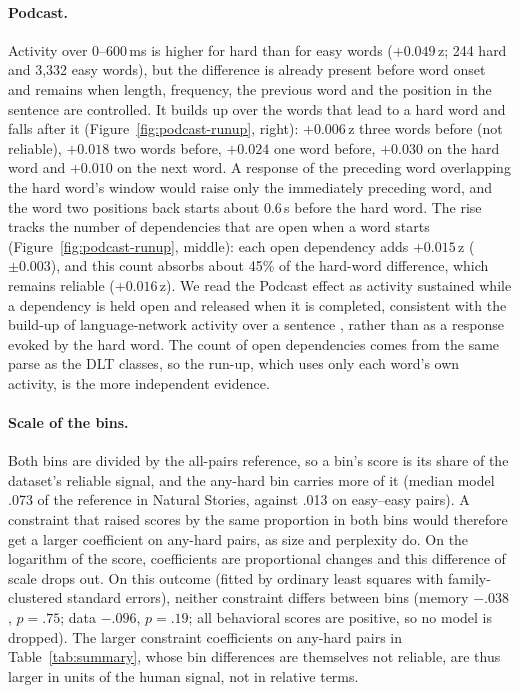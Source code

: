 \paragraph{Podcast.} Activity over 0--600\,ms is higher for hard than for easy words ($+0.049$\,z; 244 hard and 3,332 easy words), but the difference is already present before word onset and remains when length, frequency, the previous word and the position in the sentence are controlled. It builds up over the words that lead to a hard word and falls after it (Figure~\ref{fig:podcast-runup}, right): $+0.006$\,z three words before (not reliable), $+0.018$ two words before, $+0.024$ one word before, $+0.030$ on the hard word and $+0.010$ on the next word. A response of the preceding word overlapping the hard word's window would raise only the immediately preceding word, and the word two positions back starts about 0.6\,s before the hard word. The rise tracks the number of dependencies that are open when a word starts (Figure~\ref{fig:podcast-runup}, middle): each open dependency adds $+0.015$\,z ($\pm0.003$), and this count absorbs about 45\% of the hard-word difference, which remains reliable ($+0.016$\,z). We read the Podcast effect as activity sustained while a dependency is held open and released when it is completed, consistent with the build-up of language-network activity over a sentence \citep{fedorenko2016neural}, rather than as a response evoked by the hard word. The count of open dependencies comes from the same parse as the DLT classes, so the run-up, which uses only each word's own activity, is the more independent evidence.

\paragraph{Scale of the bins.} Both bins are divided by the all-pairs reference, so a bin's score is its share of the dataset's reliable signal, and the any-hard bin carries more of it (median model .073 of the reference in Natural Stories, against .013 on easy--easy pairs). A constraint that raised scores by the same proportion in both bins would therefore get a larger coefficient on any-hard pairs, as size and perplexity do. On the logarithm of the score, coefficients are proportional changes and this difference of scale drops out. On this outcome (fitted by ordinary least squares with family-clustered standard errors), neither constraint differs between bins (memory $-.038$, $p=.75$; data $-.096$, $p=.19$; all behavioral scores are positive, so no model is dropped). The larger constraint coefficients on any-hard pairs in Table~\ref{tab:summary}, whose bin differences are themselves not reliable, are thus larger in units of the human signal, not in relative terms.

